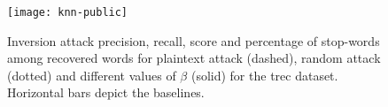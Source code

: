 \begin{figure}[h]
	\centering
	\texttt{[image: knn-public]} %
	\caption[Inversion attack accuracy metrics for different $\beta$ for \acrshort{trec} dataset]{
		Inversion attack {\color{MatplotlibOne}precision}, {\color{MatplotlibTwo}recall}, {\color{MatplotlibThree}\FOne{} score} and {\color{MatplotlibFive}percentage of stop-words among recovered words} for plaintext attack (dashed), random attack (dotted) and different values of $\beta$ (solid) for the \acrshort{trec} dataset.
		Horizontal bars depict the baselines.
	}\label{figure:knn-public}
\end{figure}
